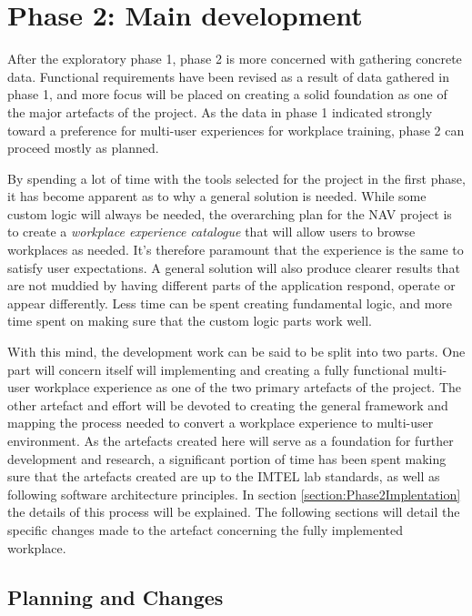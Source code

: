 
\chapter{Phase 2:  Main development}
\label{chap:phase2}

After the exploratory phase 1, phase 2 is more concerned with gathering concrete data. Functional requirements have been revised as a result of data gathered in phase 1, and more focus will be placed on creating a solid foundation as one of the major artefacts of the project. As the data in phase 1 indicated strongly toward a preference for multi-user experiences for workplace training, phase 2 can proceed mostly as planned.

By spending a lot of time with the tools selected for the project in the first phase, it has become apparent as to why a general solution is needed. While some custom logic will always be needed, the overarching plan for the NAV project is to create a \textit{workplace experience catalogue} that will allow users to browse workplaces as needed. It's therefore paramount that the experience is the same to satisfy user expectations. A general solution will also produce clearer results that are not muddied by having different parts of the application respond, operate or appear differently. Less time can be spent creating fundamental logic, and more time spent on making sure that the custom logic parts work well.

With this mind, the development work can be said to be split into two parts. One part will concern itself will implementing and creating a fully functional multi-user workplace experience as one of the two primary artefacts of the project. The other artefact and effort will be devoted to creating the general framework and mapping the process needed to convert a workplace experience to multi-user environment. As the artefacts created here will serve as a foundation for further development and research, a significant portion of time has been spent making sure that the artefacts created are up to the IMTEL lab standards, as well as following software architecture principles. In section \ref{section:Phase2Implentation} the details of this process will be explained. The following sections will detail the specific changes made to the artefact concerning the fully implemented workplace.


\section{Planning and Changes}


